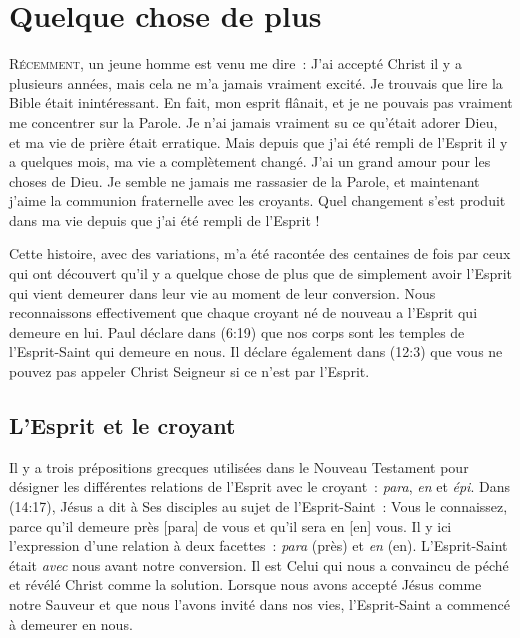 \chapter{Quelque chose de plus}

\lettrine{R}{écemment}, un jeune homme est venu me dire~:
 \og J'ai accepté Christ il y a plusieurs années,
 mais cela ne m'a jamais vraiment excité.
 Je trouvais que lire la Bible était inintéressant.
 En fait, mon esprit flânait, et je ne pouvais pas vraiment me concentrer
 sur la Parole. Je n'ai jamais vraiment su ce qu'était adorer Dieu,
 et ma vie de prière était erratique. Mais depuis que j'ai été rempli
 de l'Esprit il y a quelques mois, ma vie a complètement changé.
 J'ai un grand amour pour les choses de Dieu.
 Je semble ne jamais me rassasier de la Parole, et maintenant j'aime
 la communion fraternelle avec les croyants.
 Quel changement s'est produit dans ma vie depuis que j'ai été rempli
 de l'Esprit ! \fg{}

Cette histoire, avec des variations, m'a été racontée des centaines de fois
 par ceux qui ont découvert qu'il y a quelque chose de plus que de simplement
 avoir l'Esprit qui vient demeurer dans leur vie au moment de leur conversion.
 Nous reconnaissons effectivement que chaque croyant né de nouveau a l'Esprit
 qui demeure en lui. Paul déclare dans (6:19) que nos corps
 sont les temples de l'Esprit-Saint qui demeure en nous.
 Il déclare également dans (12:3) que vous ne pouvez pas
 appeler Christ Seigneur si ce n'est par l'Esprit.


\section*{L'Esprit et le croyant}

Il y a trois prépositions grecques utilisées dans le Nouveau Testament
 pour désigner les différentes relations de l'Esprit avec le croyant~:
 \emph{para}, \emph{en} et \emph{épi}.
 Dans (14:17), Jésus a dit à Ses disciples au sujet de
 l'Esprit-Saint~: \og Vous le connaissez, parce qu'il demeure près [para]
 de vous et qu'il sera en [en] vous. \fg{}
 Il y ici l'expression d'une relation à deux facettes~:
 \emph{para} (près) et \emph{en} (en).
 L'Esprit-Saint était \emph{avec} nous avant notre conversion.
 Il est Celui qui nous a convaincu de péché et révélé Christ
 comme la solution. Lorsque nous avons accepté Jésus comme notre Sauveur
 et que nous l'avons invité dans nos vies, l'Esprit-Saint
 a commencé à demeurer en nous.

